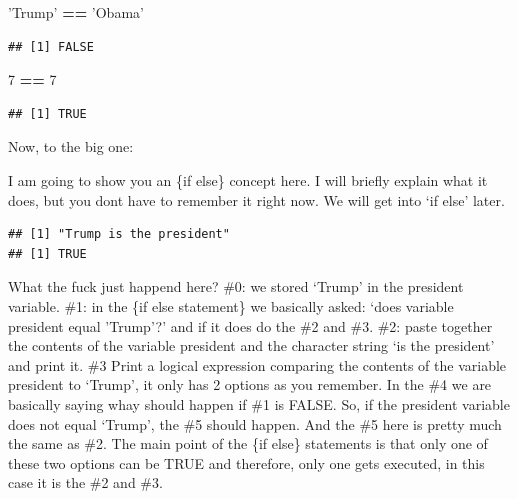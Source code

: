 \documentclass[]{book}
\newenvironment{Shaded}{\begin{snugshade}}{\end{snugshade}}
\newcommand{\CommentTok}[1]{\textcolor[rgb]{0.56,0.35,0.01}{\textit{#1}}}
\newcommand{\ControlFlowTok}[1]{\textcolor[rgb]{0.13,0.29,0.53}{\textbf{#1}}}
\newcommand{\DecValTok}[1]{\textcolor[rgb]{0.00,0.00,0.81}{#1}}
\newcommand{\KeywordTok}[1]{\textcolor[rgb]{0.13,0.29,0.53}{\textbf{#1}}}
\newcommand{\NormalTok}[1]{#1}
\newcommand{\OperatorTok}[1]{\textcolor[rgb]{0.81,0.36,0.00}{\textbf{#1}}}
\newcommand{\StringTok}[1]{\textcolor[rgb]{0.31,0.60,0.02}{#1}}
\begin{document}
\begin{Shaded}
\begin{Highlighting}[]
\StringTok{'Trump'} \OperatorTok{==}\StringTok{ 'Obama'}
\end{Highlighting}
\end{Shaded}

\begin{verbatim}
## [1] FALSE
\end{verbatim}

\begin{Shaded}
\begin{Highlighting}[]
\DecValTok{7} \OperatorTok{==}\StringTok{ }\DecValTok{7}
\end{Highlighting}
\end{Shaded}

\begin{verbatim}
## [1] TRUE
\end{verbatim}

Now, to the big one:

I am going to show you an \{if else\} concept here. I will briefly explain what it does, but you dont have to remember it right now. We will get into `if else' later.

\begin{Shaded}
\end{Shaded}

\begin{verbatim}
## [1] "Trump is the president"
## [1] TRUE
\end{verbatim}

What the fuck just happend here? \#0: we stored `Trump' in the president variable. \#1: in the \{if else statement\} we basically asked: `does variable president equal 'Trump'?' and if it does do the \#2 and \#3. \#2: paste together the contents of the variable president and the character string `is the president' and print it. \#3 Print a logical expression comparing the contents of the variable president to `Trump', it only has 2 options as you remember. In the \#4 we are basically saying whay should happen if \#1 is FALSE. So, if the president variable does not equal `Trump', the \#5 should happen. And the \#5 here is pretty much the same as \#2. The main point of the \{if else\} statements is that only one of these two options can be TRUE and therefore, only one gets executed, in this case it is the \#2 and \#3.
\end{document}
